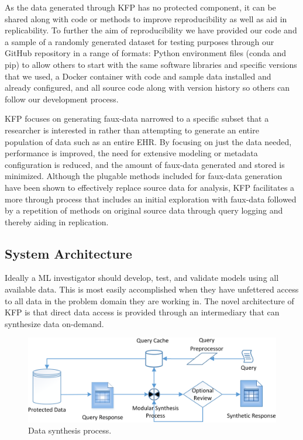 \documentclass{article}
\begin{document}
As the data generated through KFP has no protected component, it can be shared along with code or methods to improve reproducibility as well as aid in replicability. To further the aim of reproducibility we have provided our code and a sample of a randomly generated dataset for testing purposes through our GitHub repository in a range of formats: Python environment files (conda and pip) to allow others to start with the same software libraries and specific versions that we used, a Docker container with code and sample data installed and already configured, and all source code along with version history so others can follow our development process.

KFP focuses on generating faux-data narrowed to a specific subset that a researcher is interested in rather than attempting to generate an entire population of data such as an entire EHR. By focusing on just the data needed, performance is improved, the need for extensive modeling or metadata configuration is reduced, and the amount of faux-data generated and stored is minimized. Although the plugable methods included for faux-data generation have been shown to effectively replace source data for analysis, KFP facilitates a more through process that includes an initial exploration with faux-data followed by a repetition of methods on original source data through query logging and thereby aiding in replication.

\subsection{System Architecture}

Ideally a ML investigator should develop, test, and validate models using all available data. This is most easily accomplished when they have unfettered access to all data in the problem domain they are working in. The novel architecture of KFP is that direct data access is provided through an intermediary that can synthesize data on-demand.

\begin{figure}[ht]
  \centering
  \includegraphics[width=120mm]{data_synthesis_process}
  \caption{Data synthesis process.}
  \label{fig:synthesis_process}
\end{figure}
\end{document}
